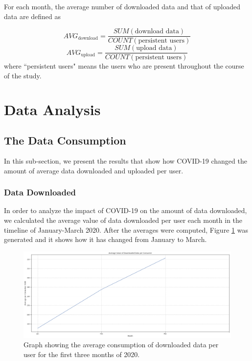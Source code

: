 \documentclass[conference,10pt]{IEEEtran}
\begin{document}
For each month, the average number of downloaded data and that of uploaded data are defined as

\begin{equation}
    AVG_{\text{download}} =\frac{SUM(\text{download data})}{COUNT(\text{persistent users})}
\end{equation}
\begin{equation}
    AVG_{\text{upload}} =\frac{SUM(\text{upload data})}{COUNT(\text{persistent users})}
\end{equation}
where ``persistent users" means the users who are present throughout the course of the study.

\section{Data Analysis}
\label{sec:data-analysis}




\subsection{The Data Consumption}
\label{sec:the-data-consumption}
In this sub-section, we present the results that show how COVID-19 changed the amount of average data downloaded and uploaded per user.

\subsubsection{Data Downloaded}
\label{sec:download-data-consumption}

In order to analyze the impact of COVID-19 on the amount of data downloaded, we calculated the average value of data downloaded per user each month in the timeline of January-March 2020. After the averages were computed, Figure \ref{fig:download2020} was generated and it shows how it has changed from January to March.

\begin{figure}
\centering
\includegraphics[width=1.0\linewidth]{figs/download2020.PNG}
\caption{Graph showing the average consumption of downloaded data per user for the first three months of 2020.}
\label{fig:download2020}
\end{figure}
\end{document}
